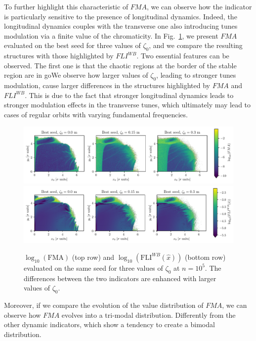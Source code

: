 To further highlight this characteristic of $FMA$, we can observe how the indicator is particularly sensitive to the presence of longitudinal dynamics. Indeed, the longitudinal dynamics couples with the transverse one also introducing tunes modulation via a finite value of the chromaticity. In Fig.~\ref{fig:fma_vs_fli}, we present $FMA$ evaluated on the best seed for three values of $\zeta_0$, and we compare the resulting structures with those highlighted by $FLI^{WB}$. Two essential features can be observed. The first one is that the chaotic regions at the border of the stable region are in goWe observe how larger values of $\zeta_0$, leading to stronger tunes modulation, cause larger differences in the structures highlighted by $FMA$ and $FLI^{WB}$. This is due to the fact that stronger longitudinal dynamics leads to stronger modulation effects in the transverse tunes, which ultimately may lead to cases of regular orbits with varying fundamental frequencies.   


\begin{figure}[ht]
    \centering
    \includegraphics[width=1.0\textwidth]{6_lhc_dynamic_indicators/figs/FMA.pdf}
    \includegraphics[width=1.0\textwidth]{6_lhc_dynamic_indicators/figs/FMA_addendum.pdf}
    \caption{$\log_{10}(\mathrm{FMA})$ (top row) and $\log_{10}(\mathrm{FLI}^{WB}(\hat{x}))$ (bottom row) evaluated on the same seed for three values of $\zeta_0$ at $n=10^5$. The differences between the two indicators are enhanced with larger values of $\zeta_0$.}
    \label{fig:fma_vs_fli}
\end{figure}

Moreover, if we compare the evolution of the value distribution of $FMA$, we can observe how $FMA$ evolves into a tri-modal distribution. Differently from the other dynamic indicators, which show a tendency to create a 
bimodal distribution.

